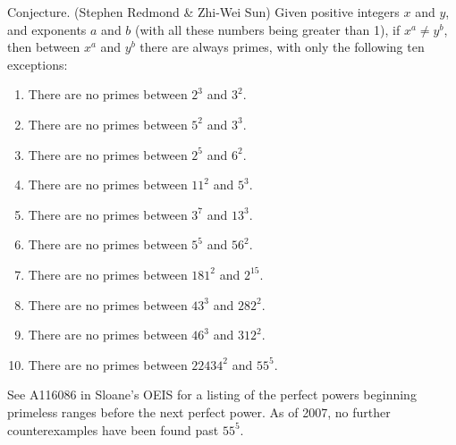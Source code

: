 \documentclass[12pt]{article}
\begin{document}
Conjecture. (Stephen Redmond \& Zhi-Wei Sun) Given positive integers $x$ and $y$, and exponents $a$ and $b$ (with all these numbers being greater than 1), if $x^a \neq y^b$, then between $x^a$ and $y^b$ there are always primes, with only the following ten exceptions:

\begin{enumerate}
\item There are no primes between $2^3$ and $3^2$.
\item There are no primes between $5^2$ and $3^3$.
\item There are no primes between $2^5$ and $6^2$.
\item There are no primes between $11^2$ and $5^3$.
\item There are no primes between $3^7$ and $13^3$.
\item There are no primes between $5^5$ and $56^2$.
\item There are no primes between $181^2$ and $2^{15}$.
\item There are no primes between $43^3$ and $282^2$.
\item There are no primes between $46^3$ and $312^2$.
\item There are no primes between $22434^2$ and $55^5$.
\end{enumerate}

See A116086 in Sloane's OEIS for a listing of the perfect powers beginning primeless ranges before the next perfect power. As of 2007, no further counterexamples have been found past $55^5$.
\end{document}
